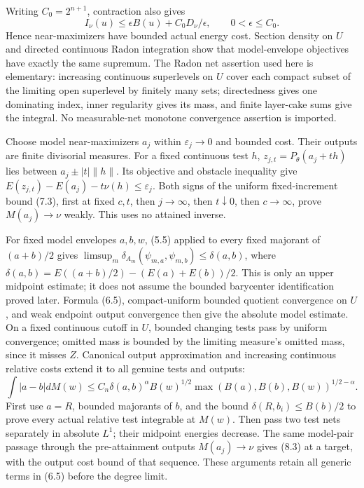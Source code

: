 \documentclass[10pt]{article}
\begin{document}
Writing $C_0=2^{n+1}$, contraction also gives
\[
 I_\nu(u)\leq\epsilon B(u)+C_0D_\nu/\epsilon,
 \qquad 0<\epsilon\leq C_0.
 \tag{8.2}
\]
Hence near-maximizers have bounded actual energy cost. Section density
on $U$ and directed continuous Radon integration show that model-envelope
objectives have exactly the same supremum. The Radon net assertion used
here is elementary: increasing continuous superlevels on $U$ cover each
compact subset of the limiting open superlevel by finitely many sets;
directedness gives one dominating index, inner regularity gives its mass,
and finite layer-cake sums give the integral. No measurable-net monotone
convergence assertion is imported.

Choose model near-maximizers $a_j$ within $\varepsilon_j\to0$ and bounded
cost. Their outputs are finite divisorial measures. For a fixed continuous
test $h$, $z_{j,t}=P_\theta(a_j+th)$ lies between
$a_j\pm|t|\|h\|$. Its objective and obstacle inequality give
$E(z_{j,t})-E(a_j)-t\nu(h)\leq\varepsilon_j$.
Both signs of the uniform fixed-increment bound (7.3), first at fixed
$c,t$, then $j\to\infty$, then $t\downarrow0$, then $c\to\infty$,
prove $M(a_j)\to\nu$ weakly. This uses no attained inverse.

For fixed model envelopes $a,b,w$, (5.5) applied to every fixed majorant
of $(a+b)/2$ gives
$\limsup_m\delta_{A_m}(\psi_{m,a},\psi_{m,b})\leq\delta(a,b)$,
where $\delta(a,b)=E((a+b)/2)-(E(a)+E(b))/2$.
This is only an upper midpoint estimate; it does not assume the bounded
barycenter identification proved later. Formula (6.5), compact-uniform
bounded quotient convergence on $U$, and weak endpoint output convergence
then give the absolute model estimate. On a fixed continuous cutoff in
$U$, bounded changing tests pass by uniform convergence; omitted mass
is bounded by the limiting measure's omitted mass, since it misses $Z$.
Canonical output approximation and increasing continuous relative costs
extend it to all genuine tests and outputs:
\[
 \int|a-b|dM(w)\leq
 C_n\delta(a,b)^\alpha B(w)^{1/2}
       \max(B(a),B(b),B(w))^{1/2-\alpha}.
 \tag{8.3}
\]
First use $a=R$, bounded majorants of $b$, and the bound
$\delta(R,b_i)\leq B(b)/2$ to prove every actual relative test
integrable at $M(w)$. Then pass two test nets separately in absolute
$L^1$; their midpoint energies decrease. The same model-pair passage
through the pre-attainment outputs $M(a_j)\to\nu$ gives (8.3) at a
target, with the output cost bound of that sequence. These arguments
retain all generic terms in (6.5) before the degree limit.
\end{document}
